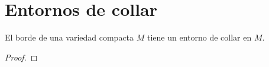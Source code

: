 \section{Entornos de collar}

\begin{teo}
El borde de una variedad compacta $M$ tiene un entorno de collar en $M$.
\end{teo}

\begin{proof}


\end{proof}










